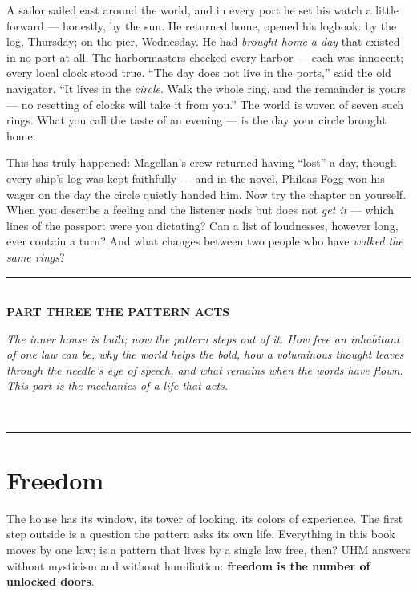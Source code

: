 \documentclass[11pt,letterpaper]{article}
\newcommand{\partline}[2]{%
  \clearpage\vspace*{4pt}\begin{center}
  {\color{fact}\rule{0.55\textwidth}{0.4pt}}\\[9pt]
  {\large\bfseries #1}\\[7pt]
  \begin{minipage}{0.82\textwidth}\centering\small\itshape\color{plosgray} #2\end{minipage}\\[9pt]
  {\color{fact}\rule{0.55\textwidth}{0.4pt}}
  \end{center}\bigskip}
\begin{document}
\begin{talebox}
A sailor sailed east around the world, and in every port he set his
watch a little forward --- honestly, by the sun. He returned home,
opened his logbook: by the log, Thursday; on the pier, Wednesday.
He had \emph{brought home a day} that existed in no port at all.
The harbormasters checked every harbor --- each was innocent; every
local clock stood true. ``The day does not live in the ports,'' said
the old navigator. ``It lives in the \emph{circle}. Walk the whole
ring, and the remainder is yours --- no resetting of clocks will
take it from you.'' The world is woven of seven such rings. What
you call the taste of an evening --- is the day your circle brought
home.
\end{talebox}

\begin{askbox}
This has truly happened: Magellan's crew returned having ``lost'' a
day, though every ship's log was kept faithfully --- and in the
novel, Phileas Fogg won his wager on the day the circle quietly
handed him. Now try the chapter on yourself. When you describe a
feeling and the listener nods but does not \emph{get it} --- which
lines of the passport were you dictating? Can a list of loudnesses,
however long, ever contain a turn? And what changes between two
people who have \emph{walked the same rings}?
\end{askbox}

\partline{PART THREE \;\textperiodcentered\; THE PATTERN ACTS}{The inner house is built;
now the pattern steps out of it. How free an inhabitant of one law can be, why the world
helps the bold, how a voluminous thought leaves through the needle's eye of speech, and what
remains when the words have flown. This part is the mechanics of a life that acts.}

\section{Freedom}
\label{sec:freedom}

The house has its window, its tower of looking, its colors of
experience. The first step outside is a question the pattern asks
its own life. Everything in this book moves by one law; is a pattern that
lives by a single law free, then? UHM answers without mysticism and
without humiliation: \textbf{freedom is the number of unlocked
doors}.
\end{document}

